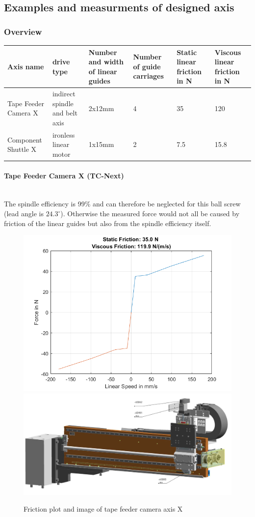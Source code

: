 		
		\subsection{Examples and measurments of designed axis}
			\subsubsection{Overview}
				\begin{table}[h!]\centering
					{\def\arraystretch{2}\tabcolsep=10pt
						\begin{tabular}{|p{2cm}|p{2.5cm}|p{2.2cm}|p{1.4cm}|p{2.3cm}|p{2.3cm}|}
							\hline
							\textbf{Axis name} & \textbf{drive typ}e & \textbf{Number and width of linear guides} & \textbf{Number of guide carriages} & \textbf{Static linear friction in N} & \textbf{Viscous linear friction in N}\\
							\hline
							Tape Feeder Camera X & indirect spindle and belt axis & 2x12mm & 4 & 35 & 120\\
							Component Shuttle X & ironless linear motor & 1x15mm & 2 & 7.5 & 15.8\\
							\hline
						\end{tabular}
				}\end{table}
			
			\paragraph{Tape Feeder Camera X (TC-Next)}\leavevmode\\
				The spindle efficiency is 99\% and can therefore be neglected for this ball screw (lead angle is $ 24.3^{\circ} $). Otherwise the measured force would not all be caused by friction of the linear guides but also from the spindle efficiency itself.
				\begin{figure}[h!]
					\centering
					\includegraphics[width=0.49\linewidth]{./pics/firction_tapefeederX.png}
					\includegraphics[width=0.45\linewidth]{./pics/tapefeederX.jpg}
					\caption{Friction plot and image of tape feeder camera axis X}
				\end{figure}
